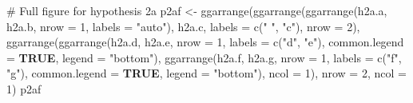 \documentclass[
  bookmarksnumbered]{article}
\newenvironment{Shaded}{\begin{snugshade}}{\end{snugshade}}
\newcommand{\AttributeTok}[1]{\textcolor[rgb]{0.80,0.80,0.80}{#1}}
\newcommand{\CommentTok}[1]{\textcolor[rgb]{0.50,0.62,0.50}{#1}}
\newcommand{\ConstantTok}[1]{\textcolor[rgb]{0.86,0.64,0.64}{\textbf{#1}}}
\newcommand{\DecValTok}[1]{\textcolor[rgb]{0.86,0.86,0.80}{#1}}
\newcommand{\FunctionTok}[1]{\textcolor[rgb]{0.94,0.94,0.56}{#1}}
\newcommand{\NormalTok}[1]{\textcolor[rgb]{0.80,0.80,0.80}{#1}}
\newcommand{\OtherTok}[1]{\textcolor[rgb]{0.94,0.94,0.56}{#1}}
\newcommand{\StringTok}[1]{\textcolor[rgb]{0.80,0.58,0.58}{#1}}
\begin{document}
\begin{Shaded}
\begin{Highlighting}[]
\CommentTok{\# Full figure for hypothesis 2a}
\NormalTok{p2af }\OtherTok{\textless{}{-}} \FunctionTok{ggarrange}\NormalTok{(}\FunctionTok{ggarrange}\NormalTok{(}\FunctionTok{ggarrange}\NormalTok{(h2a.a, h2a.b,}
                                      \AttributeTok{nrow =} \DecValTok{1}\NormalTok{,}
                                      \AttributeTok{labels =} \StringTok{"auto"}\NormalTok{), }
\NormalTok{                            h2a.c,}
                            \AttributeTok{labels =} \FunctionTok{c}\NormalTok{(}\StringTok{" "}\NormalTok{, }\StringTok{"c"}\NormalTok{),}
                            \AttributeTok{nrow =} \DecValTok{2}\NormalTok{), }
                  \FunctionTok{ggarrange}\NormalTok{(}\FunctionTok{ggarrange}\NormalTok{(h2a.d, h2a.e,}
                                      \AttributeTok{nrow =} \DecValTok{1}\NormalTok{,}
                                      \AttributeTok{labels =} \FunctionTok{c}\NormalTok{(}\StringTok{"d"}\NormalTok{, }\StringTok{"e"}\NormalTok{),}
                                      \AttributeTok{common.legend =} \ConstantTok{TRUE}\NormalTok{,}
                                      \AttributeTok{legend =} \StringTok{"bottom"}\NormalTok{),}
                            \FunctionTok{ggarrange}\NormalTok{(h2a.f, h2a.g,}
                                      \AttributeTok{nrow =} \DecValTok{1}\NormalTok{,}
                                      \AttributeTok{labels =} \FunctionTok{c}\NormalTok{(}\StringTok{"f"}\NormalTok{, }\StringTok{"g"}\NormalTok{),}
                                      \AttributeTok{common.legend =} \ConstantTok{TRUE}\NormalTok{,}
                                      \AttributeTok{legend =} \StringTok{"bottom"}\NormalTok{),}
                            \AttributeTok{ncol =} \DecValTok{1}\NormalTok{),}
                  \AttributeTok{nrow =} \DecValTok{2}\NormalTok{,}
                  \AttributeTok{ncol =} \DecValTok{1}\NormalTok{)}
\NormalTok{p2af}
\end{Highlighting}
\end{Shaded}
\end{document}
